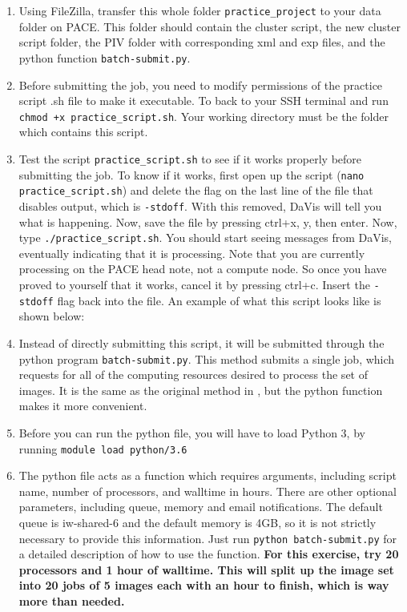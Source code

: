 \documentclass{article}
\begin{document}
\begin{enumerate}
    	\item Using FileZilla, transfer this whole folder \texttt{practice\_project} to your data folder on PACE.  This folder should contain the cluster script, the new cluster script folder, the PIV folder with corresponding xml and exp files, and the python function \texttt{batch-submit.py}.
    	\item Before submitting the job, you need to modify permissions of the practice script .sh file to make it executable.  To back to your SSH terminal and run \texttt{chmod +x practice\_script.sh}.  Your working directory must be the folder which contains this script.
    	\item Test the script \texttt{practice\_script.sh} to see if it works properly before submitting the job.  To know if it works, first open up the script (\texttt{nano practice\_script.sh}) and delete the flag on the last line of the file that disables output, which is \texttt{-stdoff}.  With this removed, DaVis will tell you what is happening.  Now, save the file by pressing ctrl+x, y, then enter.  Now, type \texttt{./practice\_script.sh}.  You should start seeing messages from DaVis, eventually indicating that it is processing.  Note that you are currently processing on the PACE head note, not a compute node.  So once you have proved to yourself that it works, cancel it by pressing ctrl+c.  Insert the \texttt{-stdoff} flag back into the file.  An example of what this script looks like is shown below:
    	
    	\newpage
    	
    	\item Instead of directly submitting this script, it will be submitted through the python program \texttt{batch-submit.py}.  This method submits a single job, which requests for all of the computing resources desired to process the set of images.  It is the same as the original method in , but the python function makes it more convenient.
    	
    	\item Before you can run the python file, you will have to load Python 3, by running \texttt{module load python/3.6}
    	
    	\item The python file acts as a function which requires arguments, including script name, number of processors, and walltime in hours.  There are other optional parameters, including queue, memory and email notifications.  The default queue is iw-shared-6 and the default memory is 4GB, so it is not strictly necessary to provide this information.  Just run \texttt{python batch-submit.py} for a detailed description of how to use the function. \textbf{For this exercise, try 20 processors and 1 hour of walltime.  This will split up the image set into 20 jobs of 5 images each with an hour to finish, which is way more than needed.}
    	

\end{enumerate}
\end{document}
